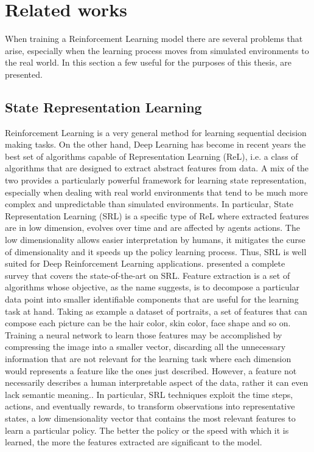 \chapter{Related works}

When training a Reinforcement Learning model there are several problems that arise, especially when the learning process moves from simulated environments to the real world. In this section a few useful for the purposes of this thesis, are presented.

\section{State Representation Learning} \label{sec:srl}

Reinforcement Learning is a very general method for learning sequential decision making tasks. On the other hand, Deep Learning has become in recent years the best set of algorithms capable of Representation Learning (ReL), i.e. a class of algorithms that are designed to extract abstract features from data. A mix of the two provides a particularly powerful framework for learning state representation, especially when dealing with real world environments that tend to be much more complex and unpredictable than simulated environments. In particular, State Representation Learning (SRL) is a specific type of ReL where extracted features are in low dimension, evolves over time and are affected by agents actions. The low dimensionality allows easier interpretation by humans, it mitigates the curse of dimensionality and it speeds up the policy learning process. Thus, SRL is well suited for Deep Reinforcement Learning applications. \citet{DBLP:journals/corr/abs-1802-04181} presented a complete survey that covers the state-of-the-art on SRL. Feature extraction is a set of algorithms whose objective, as the name suggests, is to decompose a particular data point into smaller identifiable components that are useful for the learning task at hand. Taking as example a dataset of portraits, a set of features that can compose each picture can be the hair color, skin color, face shape and so on. Training a neural network to learn those features may be accomplished by compressing the image into a smaller vector, discarding all the unnecessary information that are not relevant for the learning task where each dimension would represents a feature like the ones just described. However, a feature not necessarily describes a human interpretable aspect of the data, rather it can even lack semantic meaning.. In particular, SRL techniques exploit the time steps, actions, and eventually rewards, to transform observations into representative states, a low dimensionality vector that contains the most relevant features to learn a particular policy. The better the policy or the speed with which it is learned, the more the features extracted are significant to the model.

